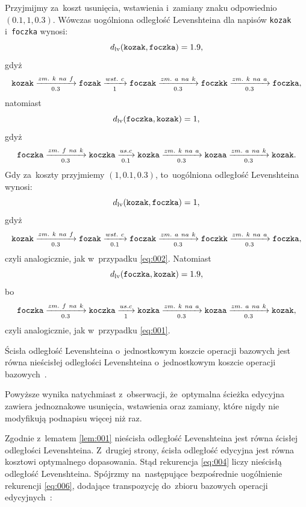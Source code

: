 \documentclass{praca1}
\begin{document}
\begin{example}
Przyjmijmy za~koszt usunięcia, wstawienia i~zamiany znaku odpowiednio $(0.1, 1, 0.3)$. Wówczas uogólniona odległość Levenshteina dla napisów \verb|kozak| i~\verb|foczka| wynosi:
\begin{equation}
\label{eq:001}
d_{\mathrm{lv}}(\verb|kozak|, \verb|foczka|) = 1.9,
\end{equation}
gdyż
$$
\verb|kozak|  \xrightarrow[0.3]{zm.\ k\ na\ f} \verb|fozak| \xrightarrow[1]{wst.\ c} \verb|foczak| \xrightarrow[0.3]{zm.\ a\ na\ k} \verb|foczkk| \xrightarrow[0.3]{zm.\ k\ na\ a} \verb|foczka|,
$$
natomiast
\begin{equation}\label{eq:002}
d_{\mathrm{lv}}(\verb|foczka|, \verb|kozak|) = 1,
\end{equation}
gdyż
$$
\verb|foczka|  \xrightarrow[0.3]{zm.\ f\ na\ k} \verb|koczka|  \xrightarrow[0.1]{us. c} \verb|kozka| \xrightarrow[0.3]{zm.\ k\ na\ a} \verb|kozaa| \xrightarrow[0.3]{zm.\ a\ na\ k} \verb|kozak|.
$$
Gdy za~koszty przyjmiemy $(1, 0.1, 0.3)$, to~uogólniona odległość Levenshteina wynosi:
$$
d_{\mathrm{lv}}(\verb|kozak|, \verb|foczka|) = 1,
$$
gdyż
$$
\verb|kozak|  \xrightarrow[0.3]{zm.\ k\ na\ f} \verb|fozak| \xrightarrow[0.1]{wst.\ c} \verb|foczak| \xrightarrow[0.3]{zm.\ a\ na\ k} \verb|foczkk| \xrightarrow[0.3]{zm.\ k\ na\ a} \verb|foczka|,
$$
czyli analogicznie, jak w~przypadku \eqref{eq:002}. Natomiast
$$
d_{\mathrm{lv}}(\verb|foczka|, \verb|kozak|) = 1.9,
$$
bo
$$
\verb|foczka|  \xrightarrow[0.3]{zm.\ f\ na\ k} \verb|koczka|  \xrightarrow[1]{us. c} \verb|kozka| \xrightarrow[0.3]{zm.\ k\ na\ a} \verb|kozaa| \xrightarrow[0.3]{zm.\ a\ na\ k} \verb|kozak|,
$$
czyli analogicznie, jak w~przypadku \eqref{eq:001}.
\end{example}


\begin{lemma}
\label{lem:001}
Ścisła odległość Levenshteina o~jednostkowym koszcie operacji bazowych jest równa nieścisłej odległości Levenshteina o~jednostkowym koszcie operacji bazowych~\cite{Boytsov2011:indexingmethods}.
\end{lemma}

Powyższe wynika natychmiast z~obserwacji, że~optymalna ścieżka edycyjna zawiera jednoznakowe usunięcia, wstawienia oraz zamiany, które nigdy nie modyfikują podnapisu więcej niż raz.


Zgodnie z~lematem \ref{lem:001} nieścisła odległość Levenshteina jest równa ścisłej odległości Levenshteina. Z~drugiej strony, ścisła odległość edycyjna jest równa kosztowi optymalnego dopasowania. Stąd rekurencja \eqref{eq:004} liczy nieścisłą odległość Levenshteina. Spójrzmy na~następujące bezpośrednie uogólnienie rekurencji \eqref{eq:006}, dodające transpozycję do~zbioru bazowych operacji edycyjnych~\cite{Boytsov2011:indexingmethods}:
\end{document}
